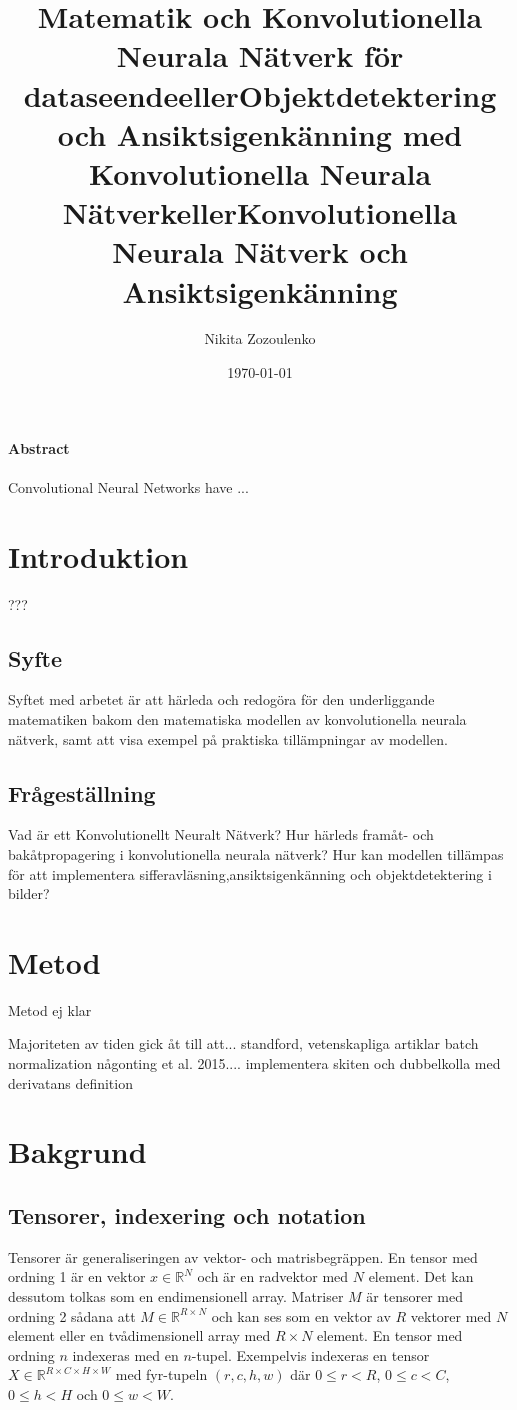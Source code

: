 \documentclass[a4paper,11pt,twoside]{article}
\title{Matematik och Konvolutionella Neurala Nätverk för dataseende}
\title{eller}
\title{Objektdetektering och Ansiktsigenkänning med Konvolutionella Neurala Nätverk}
\title{eller}
\title{Konvolutionella Neurala Nätverk och Ansiktsigenkänning}
\author{Nikita Zozoulenko}
\date{\today}
\begin{document}
\begin{titlepage}
\maketitle
\end{titlepage}


\Large{\textbf{Abstract}}\\\\
Convolutional Neural Networks have ...
\newpage

\tableofcontents

\section{Introduktion}

???
\subsection{Syfte}
Syftet med arbetet är att härleda och redogöra för den underliggande matematiken bakom den matematiska modellen av konvolutionella neurala nätverk, samt att visa exempel på praktiska tillämpningar av modellen.
\subsection{Frågeställning}
Vad är ett Konvolutionellt Neuralt Nätverk?
Hur härleds framåt- och bakåtpropagering i konvolutionella neurala nätverk?
Hur kan modellen tillämpas för att implementera sifferavläsning,ansiktsigenkänning och objektdetektering i bilder?


\newpage
\section{Metod}
Metod ej klar

Majoriteten av tiden gick åt till att... standford, vetenskapliga artiklar batch normalization någonting et al. 2015.... implementera skiten och dubbelkolla med derivatans definition

\newpage
\section{Bakgrund}

\subsection{Tensorer, indexering och notation}
Tensorer är generaliseringen av vektor- och matrisbegräppen. En tensor med ordning 1 är en vektor $x \in \mathbb{R}^N$ och är en radvektor med $N$ element. Det kan dessutom tolkas som en endimensionell array. Matriser $M$ är tensorer med ordning 2 sådana att $M \in \mathbb{R}^{R \times N}$ och kan ses som en vektor av $R$ vektorer med $N$ element eller en tvådimensionell array med $R \times N$ element. En tensor med ordning $n$ indexeras med en $n$-tupel. Exempelvis indexeras en tensor $X \in \mathbb{R}^{R \times C \times H \times W}$ med fyr-tupeln $(r,c,h,w)$ där $0 \leq r < R$, $0 \leq c < C$, $0 \leq h < H$ och $0 \leq w < W$. \cite{cs231n}
\end{document}
